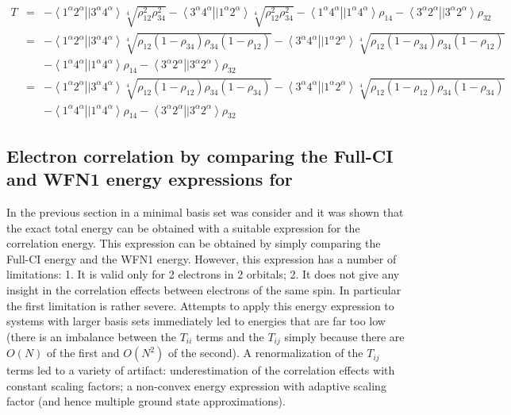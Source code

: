 \documentclass[pra,nofootinbib]{revtex4-1}
\newcommand{\erib}[4]{\left\langle #1^\alpha #2^\alpha \right.\left|| #3^\alpha #4^\alpha \right\rangle}
\begin{document}
\begin{eqnarray}
   T &=& -\erib{1}{2}{3}{4}\sqrt[4]{\rho_{12}^2\rho_{34}^2}
         -\erib{3}{4}{1}{2}\sqrt[4]{\rho_{12}^2\rho_{34}^2}
         -\erib{1}{4}{1}{4}\rho_{14}
         -\erib{3}{2}{3}{2}\rho_{32} \\
     &=& -\erib{1}{2}{3}{4}\sqrt[4]{\rho_{12}(1-\rho_{34})\rho_{34}(1-\rho_{12})}
         -\erib{3}{4}{1}{2}\sqrt[4]{\rho_{12}(1-\rho_{34})\rho_{34}(1-\rho_{12})} \\
     &&  -\erib{1}{4}{1}{4}\rho_{14}
         -\erib{3}{2}{3}{2}\rho_{32} \\
     &=& -\erib{1}{2}{3}{4}\sqrt[4]{\rho_{12}(1-\rho_{12})\rho_{34}(1-\rho_{34})}
         -\erib{3}{4}{1}{2}\sqrt[4]{\rho_{12}(1-\rho_{12})\rho_{34}(1-\rho_{34})} \\
     &&  -\erib{1}{4}{1}{4}\rho_{14}
         -\erib{3}{2}{3}{2}\rho_{32}
\end{eqnarray}


\subsection{Electron correlation by comparing the Full-CI and WFN1 energy expressions for }

In the previous section  in a minimal basis set was consider and it was shown 
that the exact total energy can be obtained with a suitable expression for the 
correlation energy. This expression can be obtained by simply comparing the
Full-CI energy and the WFN1 energy. However, this expression has a number of limitations:
1. It is valid only for 2 electrons in 2 orbitals; 2. It does not give any insight in
the correlation effects between electrons of the same spin. In particular the first
limitation is rather severe. Attempts to apply this energy expression to systems with larger
basis sets immediately led to energies that are far too low (there is an imbalance between
the $T_{ii}$ terms and the $T_{ij}$ simply because there are $O(N)$ of the first and $O(N^2)$
of the second). A renormalization of the $T_{ij}$ terms led to a variety of artifact: 
underestimation of the correlation effects with constant scaling factors; a non-convex energy
expression with adaptive scaling factor (and hence multiple ground state approximations). 
\end{document}

